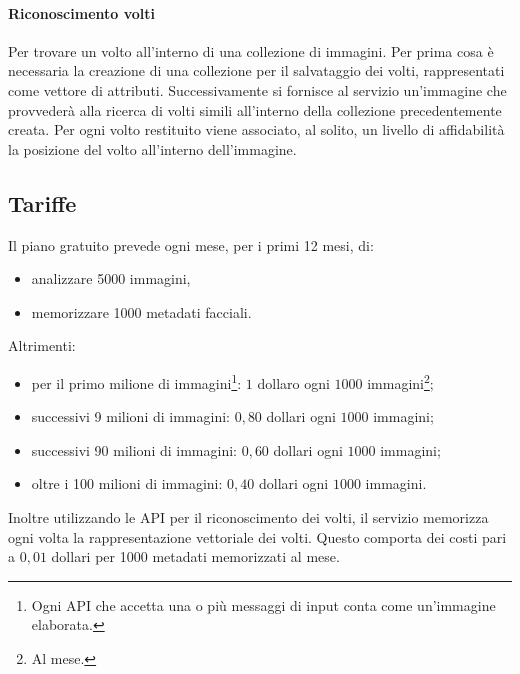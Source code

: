 \paragraph{Riconoscimento volti} Per trovare un volto all'interno di una collezione di immagini. Per prima cosa è necessaria la creazione di una collezione per il salvataggio dei volti, rappresentati come vettore di attributi.
Successivamente si fornisce al servizio un'immagine che provvederà alla ricerca di volti simili all'interno della collezione precedentemente creata.
Per ogni volto restituito viene associato, al solito, un livello di affidabilità la posizione del volto all'interno dell'immagine.


\subsection{Tariffe}
Il piano gratuito prevede ogni mese, per i primi 12 mesi, di:
\begin{itemize}
\item analizzare 5000 immagini,
\item memorizzare 1000 metadati facciali.
\end{itemize}
Altrimenti:
\begin{itemize}
\item per il primo milione di immagini\footnote{Ogni API che accetta una o più messaggi di input conta come un'immagine elaborata.}: $1$ dollaro ogni $1000$ immagini\footnote{Al mese.};
\item successivi 9 milioni di immagini: $0,80$ dollari ogni $1000$ immagini;
\item successivi 90 milioni di immagini: $0,60$ dollari ogni $1000$ immagini;
\item oltre i 100 milioni di immagini: $0,40$ dollari ogni $1000$ immagini.
\end{itemize}
Inoltre utilizzando le API per il riconoscimento dei volti, il servizio memorizza ogni volta la rappresentazione vettoriale dei volti. Questo comporta dei costi pari a $0,01$ dollari per 1000 metadati memorizzati al mese.  
